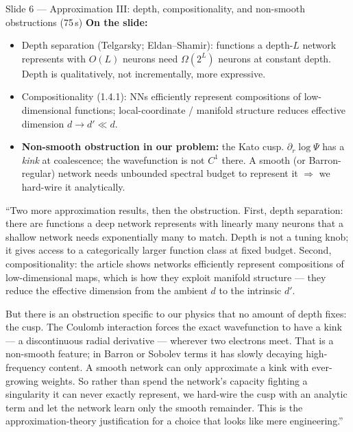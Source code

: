 \documentclass[11pt]{article}
\begin{document}
\begin{slide}{Slide 6 --- Approximation III: depth, compositionality, and non-smooth obstructions (75\,s)}
\textbf{On the slide:}
\begin{itemize}[leftmargin=*]
\item Depth separation (Telgarsky; Eldan--Shamir): functions a depth-$L$ network represents with
$O(L)$ neurons need $\Omega(2^L)$ neurons at constant depth. Depth is qualitatively, not
incrementally, more expressive.
\item Compositionality (1.4.1): NNs efficiently represent compositions of low-dimensional functions;
local-coordinate / manifold structure reduces effective dimension $d\to d'\ll d$.
\item \textbf{Non-smooth obstruction in our problem:} the Kato cusp. $\partial_r\log\Psi$ has a
\emph{kink} at coalescence; the wavefunction is not $C^1$ there. A smooth (or Barron-regular)
network needs unbounded spectral budget to represent it $\Rightarrow$ we hard-wire it analytically.
\end{itemize}
\end{slide}

\begin{say}
``Two more approximation results, then the obstruction. First, depth separation: there are functions
a deep network represents with linearly many neurons that a shallow network needs exponentially many
to match. Depth is not a tuning knob; it gives access to a categorically larger function class at
fixed budget. Second, compositionality: the article shows networks efficiently represent compositions
of low-dimensional maps, which is how they exploit manifold structure --- they reduce the effective
dimension from the ambient $d$ to the intrinsic $d'$.

But there is an obstruction specific to our physics that no amount of depth fixes: the cusp. The
Coulomb interaction forces the exact wavefunction to have a kink --- a discontinuous radial
derivative --- wherever two electrons meet. That is a non-smooth feature; in Barron or Sobolev terms
it has slowly decaying high-frequency content. A smooth network can only approximate a kink with
ever-growing weights. So rather than spend the network's capacity fighting a singularity it can never
exactly represent, we hard-wire the cusp with an analytic term and let the network learn only the
smooth remainder. This is the approximation-theory justification for a choice that looks like mere
engineering.''
\end{say}
\end{document}
